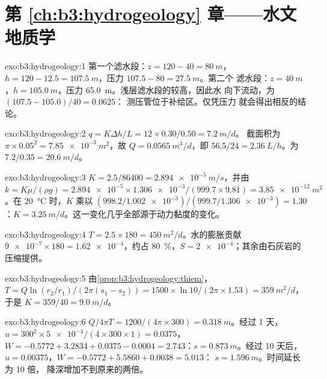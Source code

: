 \section*{第 \ref{ch:b3:hydrogeology} 章——水文地质学}

\begin{solution}{exo:b3:hydrogeology:1}
第一个滤水段：$z = 120 - 40 = \qty{80}{m}$，$h = 120 - 12.5 =
\qty{107.5}{m}$，压力 $107.5 - 80 = \qty{27.5}{m}$。第二个
滤水段：$z = \qty{40}{m}$，$h = \qty{105.0}{m}$，压力
\qty{65.0}{m}。浅层滤水段的较高，因此水
向下流动，为 $(107.5 - 105.0)/40 = \num{0.0625}$：
测压管位于补给区。仅凭压力
就会得出相反的结论。
\end{solution}

\begin{solution}{exo:b3:hydrogeology:2}
$q = K\Delta h/L = 12\times0.30/0.50 = \qty{7.2}{m/d}$。
截面积为 $\pi\times0.05^2 = \qty{7.85e-3}{m^2}$，故 $Q = \qty{0.0565}{m^3/d}$，即
$56.5/24 = \qty{2.36}{L/h}$。为 $7.2/0.35 =
\qty{20.6}{m/d}$。
\end{solution}

\begin{solution}{exo:b3:hydrogeology:3}
$K = 2.5/86400 = \qty{2.894e-5}{m/s}$，并由 $k = K\mu/(\rho g) =
\num{2.894e-5}\times\num{1.306e-3}/(999.7\times9.81) =
\qty{3.85e-12}{m^2}$。在 \qty{20}{\celsius} 时，$K$ 乘以
$(998.2/\num{1.002e-3})/(999.7/\num{1.306e-3}) = \num{1.30}$：$K =
\qty{3.25}{m/d}$。这一变化几乎全部源于动力黏度的变化。
\end{solution}

\begin{solution}{exo:b3:hydrogeology:4}
$T = 2.5\times180 = \qty{450}{m^2/d}$。水的膨胀贡献
$\num{9e-7}\times180 = \num{1.62e-4}$，约占 \qty{80}{\percent}，$S =
\num{2e-4}$；其余由石灰岩的压缩提供。
\end{solution}

\begin{solution}{exo:b3:hydrogeology:5}
由\cref{prop:b3:hydrogeology:thiem}，$T = Q\ln(r_2/r_1)/(2\pi(s_1 -
s_2)) = 1500\times\ln10/(2\pi\times1.53) = \qty{359}{m^2/d}$，于是 $K =
359/40 = \qty{9.0}{m/d}$。
\end{solution}

\begin{solution}{exo:b3:hydrogeology:6}
$Q/4\pi T = 1200/(4\pi\times300) = \qty{0.318}{m}$。经过 1 天，$u =
300^2\times\num{5e-4}/(4\times300\times1) = \num{0.0375}$，$W = -0.5772
+ 3.2834 + 0.0375 - 0.0004 = \num{2.743}$：$s = \qty{0.873}{m}$。经过
10 天后，$u = \num{0.00375}$，$W = -0.5772 + 5.5860 + 0.0038 = \num{5.013}$：
$s = \qty{1.596}{m}$。时间延长为 10 倍，
降深增加不到原来的两倍。
\end{solution}


